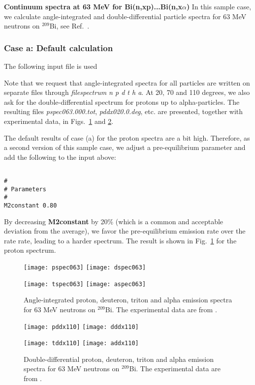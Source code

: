 \begin{samplecase}
{\bf Continuum spectra at 63 MeV for Bi(n,xp)...Bi(n,x$\alpha$)}\newline
In this sample case, we calculate angle-integrated and double-differential
particle spectra for 63 MeV neutrons on ${}^{209}$Bi, see Ref.~\cite{Raeymackers2003}.
\subsubsection{Case a: Default calculation}
The following input file is used


Note that we request that angle-integrated spectra for all particles are
written on separate files through {\em filespectrum n p d t h a}.
At 20, 70 and 110 degrees, we also ask for the
double-differential spectrum for protons up to alpha-particles.
The resulting files {\em pspec063.000.tot}, {\em pddx020.0.deg}, etc. are
presented, together with experimental data, in Figs.~\ref{s10dx} and
\ref{s10ddx}.

The default results of case (a) for the proton spectra are a bit high.
Therefore, as a second version of this sample case, we adjust a
pre-equilibrium parameter and add the following to the input above:

{\small \begin{verbatim}

#
# Parameters
#
M2constant 0.80
\end{verbatim} } \renewcommand{\baselinestretch}{1.07}\small\normalsize
\noindent
By decreasing {\bf M2constant} by 20\% (which is a common and acceptable
deviation from the average), we favor the pre-equilibrium emission
rate over the rate rate, leading to a harder spectrum. The result is
shown in Fig.~\ref{s10dx} for the proton spectrum.

\end{samplecase}
\begin{figure}
\centerline{
\centering\texttt{[image: pspec063]}
\centering\texttt{[image: dspec063]}
}
\centerline{
\centering\texttt{[image: tspec063]}
\centering\texttt{[image: aspec063]}
}
\caption{Angle-integrated proton, deuteron, triton and alpha emission spectra
for 63 MeV neutrons on ${}^{209}$Bi.
The experimental data are from \protect\cite{Raeymackers2003}.}
\label{s10dx}
\end{figure}
\begin{figure}
\centerline{
\centering\texttt{[image: pddx110]}
\centering\texttt{[image: dddx110]}
}
\centerline{
\centering\texttt{[image: tddx110]}
\centering\texttt{[image: addx110]}
}
\caption{Double-differential proton, deuteron, triton and alpha emission
spectra for 63 MeV neutrons on ${}^{209}$Bi.
The experimental data are from \protect\cite{Raeymackers2003}.}
\label{s10ddx}
\end{figure}
